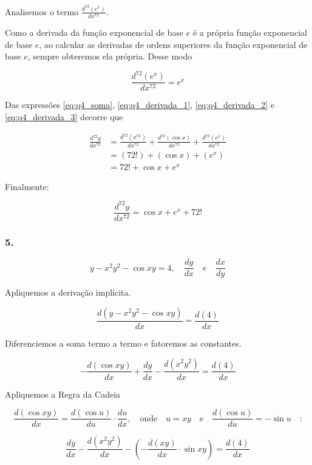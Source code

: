 \documentclass{article}
\begin{document}
Analisemos o termo \( \frac{d^{72}(e^x)}{dx^{72}} \).

Como a derivada da função exponencial de base
\(e\) é a própria função exponencial de base \(e\),
ao calcular as derivadas de ordens superiores da função
exponencial de base \(e\), sempre obteremos ela própria.
Desse modo

\begin{equation}\label{eq:q4_derivada_3}
    \frac{d^{72}(e^x)}{dx^{72}} = e^x
\end{equation}

Das expressões
\ref{eq:q4_soma},
\ref{eq:q4_derivada_1},
\ref{eq:q4_derivada_2} e
\ref{eq:q4_derivada_3}
decorre que

\begin{align*}
    \frac{d^{72}y}{dx^{72}}
     & =
    \frac{d^{72}(x^{72})}{dx^{72}}
    +
    \frac{d^{72}(\cos x )}{dx^{72}}
    +
    \frac{d^{72}(e^x)}{dx^{72}}
    \\ &=
    (72!)
    +
    (\cos x)
    +
    (e^x)
    \\ &=
    72!
    +
    \cos x
    +
    e^x
\end{align*}

Finalmente:

\[
    \frac{d^{72}y}{dx^{72}} = \cos x + e^x + 72!
\]

\subsubsection*{5.}

\[
    y - x^2y^2 - \cos xy = 4, \quad \frac{dy}{dx} \quad e \quad \frac{dx}{dy}
\]

Apliquemos a derivação implícita.

\[
    \frac{d(y - x^2y^2 - \cos xy)}{dx} = \frac{d(4)}{dx}
\]

Diferenciemos a soma termo a termo e fatoremos as constantes.

\[
    - \frac{d(\cos xy)}{dx} +  \frac{dy}{dx} - \frac{d(x^2y^2)}{dx}  = \frac{d(4)}{dx}
\]

Apliquemos a Regra da Cadeia

\[
    \frac{d(\cos xy)}{dx}
    =
    \frac{d(\cos u)}{du}
    \cdot
    \frac{du}{dx}
    ,\quad
    \text{onde}
    \quad
    u = xy
    \quad
    \text{e}
    \quad
    \frac{d(\cos u)}{du} = -\sin u
    \quad
    \text{:}
\]

\[
    \frac{dy}{dx} - \frac{d(x^2y^2)}{dx} - \left(- \frac{d(xy)}{dx} \cdot  \sin xy \right)  = \frac{d(4)}{dx}
\]
\end{document}

